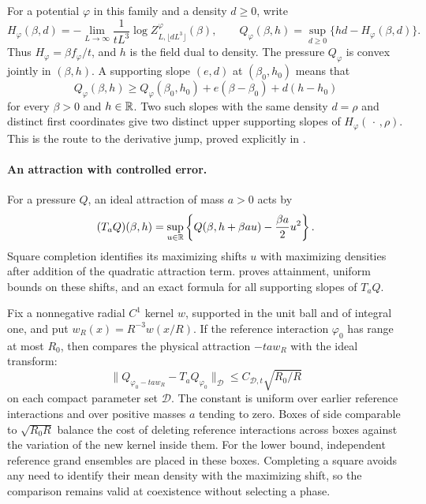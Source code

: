 For a potential \(\varphi\) in this family and a density \(d\ge0\),
write
\[
 H_\varphi(\beta,d)
 =-\lim_{L\to\infty}\frac{1}{tL^3}
        \log Z^\varphi_{L,\lfloor dL^3\rfloor}(\beta),
 \qquad
 Q_\varphi(\beta,h)
 =\sup_{d\ge0}\{hd-H_\varphi(\beta,d)\}.
\]
Thus \(H_\varphi=\beta f_\varphi/t\), and \(h\) is the field dual to
density.  The pressure \(Q_\varphi\) is convex jointly in
\((\beta,h)\).  A supporting slope \((e,d)\) at \((\beta_0,h_0)\)
means that
\[
 Q_\varphi(\beta,h)\ge Q_\varphi(\beta_0,h_0)
             +e(\beta-\beta_0)+d(h-h_0)
\]
for every \(\beta>0\) and \(h\in\mathbb R\).
Two such slopes with the same density \(d=\rho\) and distinct first
coordinates give two distinct upper supporting slopes of
\(H_\varphi(\,\cdot\,,\rho)\).  This is the route to the derivative
jump, proved explicitly in .

\paragraph{An attraction with controlled error.}
For a pressure \(Q\), an ideal attraction of mass \(a>0\) acts by
\begin{equation}\label{eq:intro-transform}
 (T_aQ)(\beta,h)
 =\sup_{u\in\mathbb R}
   \left\{Q(\beta,h+\beta au)-\frac{\beta a}{2}u^2\right\}.
\end{equation}
Square completion identifies its maximizing shifts \(u\) with
maximizing densities after addition of the quadratic attraction term.
 proves attainment, uniform bounds on these
shifts, and an exact formula for all supporting slopes of \(T_aQ\).

Fix a nonnegative radial \(C^1\) kernel \(w\), supported in the unit
ball and of integral one, and put \(w_R(x)=R^{-3}w(x/R)\).
If the reference interaction \(\varphi_0\) has range at most \(R_0\),
then  compares the physical attraction \(-ta w_R\)
with the ideal transform:
\[
 \bigl\|Q_{\varphi_0-ta w_R}-T_aQ_{\varphi_0}\bigr\|_{\mathcal D}
 \le C_{\mathcal D,t}\sqrt{R_0/R}
\]
on each compact parameter set \(\mathcal D\).  The constant is
uniform over earlier reference interactions and over positive masses
\(a\) tending to zero.  Boxes of side comparable to
\(\sqrt{R_0R}\) balance the cost of deleting reference interactions
across boxes against the variation of the new kernel inside them.
For the lower bound, independent reference grand ensembles are placed
in these boxes.  Completing a square avoids any need to identify their
mean density with the maximizing shift, so the comparison remains valid
at coexistence without selecting a phase.

